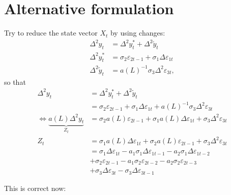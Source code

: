 \documentclass[a4paper,12pt]{article}
\begin{document}
\section{Alternative formulation}

Try to reduce the state vector $X_{t}$ by using changes:%
\begin{align}
\Delta ^{2}y_{t}& =\Delta ^{2}y_{t}^{\ast }+\Delta ^{2}\tilde{y}_{t} \\
\Delta ^{2}y_{t}^{\ast }& =\sigma _{2}\varepsilon _{2t-1}+\sigma _{1}\Delta
\varepsilon _{1t} \\
\Delta ^{2}\tilde{y}_{t}& =a(L)^{-1}\sigma _{3}\Delta ^{2}\varepsilon _{3t},
\end{align}%
so that%
\begin{align*}
\Delta ^{2}y_{t}& =\Delta ^{2}y_{t}^{\ast }+\Delta ^{2}\tilde{y}_{t} \\
& =\sigma _{2}\varepsilon _{2t-1}+\sigma _{1}\Delta \varepsilon
_{1t}+a(L)^{-1}\sigma _{3}\Delta ^{2}\varepsilon _{3t} \\
\Leftrightarrow \underbrace{a(L)\Delta ^{2}y_{t}}_{Z_{t}}& =\sigma
_{2}a(L)\varepsilon _{2t-1}+\sigma _{1}a(L)\Delta \varepsilon _{1t}+\sigma
_{3}\Delta ^{2}\varepsilon _{3t} \\
Z_{t}& =\sigma _{1}a(L)\Delta \varepsilon _{1t}+\sigma _{2}a(L)\varepsilon
_{2t-1}+\sigma _{3}\Delta ^{2}\varepsilon _{3t} \\
& =\sigma _{1}\Delta \varepsilon _{1t}-a_{1}\sigma _{1}\Delta \varepsilon
_{1t-1}-a_{2}\sigma _{1}\Delta \varepsilon _{1t-2} \\
& +\sigma _{2}\varepsilon _{2t-1}-a_{1}\sigma _{2}\varepsilon
_{2t-2}-a_{2}\sigma _{2}\varepsilon _{2t-3} \\
& +\sigma _{3}\Delta \varepsilon _{3t}-\sigma _{3}\Delta \varepsilon _{3t-1}
\end{align*}


This is correct now:
\end{document}
